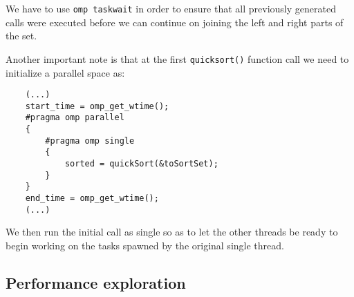 \documentclass[a4paper,11pt]{article}
\begin{document}
We have to use {\tt omp taskwait} in order to ensure that all previously generated calls were executed before we can continue on joining the left and right parts of the set.

Another important note is that at the first {\tt quicksort()} function call we need to initialize a parallel space as:

\begin{verbatim}
    (...)
    start_time = omp_get_wtime();
    #pragma omp parallel
    {
        #pragma omp single
        {
            sorted = quickSort(&toSortSet);
        }
    }
    end_time = omp_get_wtime();
    (...)
\end{verbatim}

We then run the initial call as single so as to let the other threads be ready to begin working on the tasks spawned by the original single thread.

\subsection*{Performance exploration}
\end{document}
